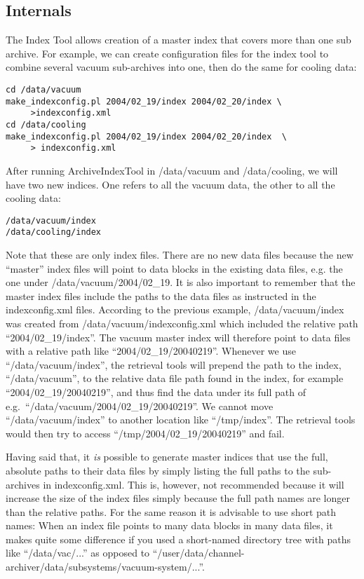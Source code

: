 \subsection{Internals}
The Index Tool allows creation of a master index
that covers more than one sub archive. For example, we can create
configuration files for the index tool to combine several vacuum
sub-archives into one, then do the same for cooling data:
\begin{lstlisting}[frame=none,keywordstyle=\sffamily]
cd /data/vacuum
make_indexconfig.pl 2004/02_19/index 2004/02_20/index \
     >indexconfig.xml
cd /data/cooling
make_indexconfig.pl 2004/02_19/index 2004/02_20/index  \
     > indexconfig.xml
\end{lstlisting}

\noindent After running ArchiveIndexTool in /data/vacuum and /data/cooling,
we will have two new indices. One refers to all the vacuum data, the
other to all the cooling data:
\begin{lstlisting}[frame=none,keywordstyle=\sffamily]
/data/vacuum/index
/data/cooling/index
\end{lstlisting}
\noindent Note that these are only index files. There are no new data
files because the new ``master'' index files will point to data blocks
in the existing data files, e.g. the one under /data/vacuum/2004/02\_19. 
It is also important to remember that the master index files include the
paths to the data files as instructed in the indexconfig.xml files.
According to the previous example,  
/data/vacuum/index was created from
/data/vacuum/indexconfig.xml which included the relative path
``2004/02\_19/index''. The vacuum master index will therefore point to
data files with a relative path like ``2004/02\_19/20040219''.
Whenever we use ``/data/vacuum/index'', the retrieval tools will prepend
the path to the index, ``/data/vacuum'', to the relative data 
file path found in the index, for example ``2004/02\_19/20040219'', and thus
find the data under its full path of
 e.g.\ ``/data/vacuum/2004/02\_19/20040219''.
We cannot move ``/data/vacuum/index'' to another location like
``/tmp/index''. The retrieval tools would then try to access
``/tmp/2004/02\_19/20040219'' and fail.

Having said that, it \emph{is} possible to generate master indices
that use the full, absolute paths to their data files by simply listing
the full paths to the sub-archives in indexconfig.xml. This is,
however, not recommended because it will increase the size of the
index files simply because the full path names are longer than the
relative paths. For the same reason it is advisable to use short path
names: When an index file points to many data blocks in many data
files, it makes quite some difference if you used a short-named
directory tree with paths like ``/data/vac/...'' as opposed to
``/user/data/channel-archiver/data/subsystems/vacuum-system/...''.

